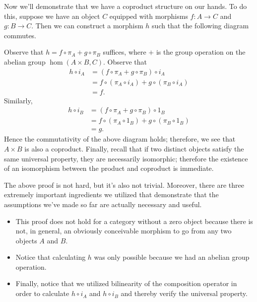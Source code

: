 \begin{prf}
\begin{center}
        \end{center} 
        Now we'll demonstrate that we have a coproduct structure on our hands. 
        To do this, suppose we have an object $C$ equipped with morphisms 
        $f: A \to C$ and $g: B \to C$. Then we can construct a morphism $h$ such that the following 
        diagram commutes. 
        \begin{center}
        \end{center}
        Observe that $h = f\circ \pi_A + g \circ \pi_B$ suffices, where 
        $+$ is the group operation on the abelian group $\hom(A \times B, C)$.
        Observe that 
        \begin{align*}
            h \circ i_A &= (f\circ \pi_A + g \circ \pi_B) \circ i_A\\
            &= f \circ (\pi_A \circ i_A) + g \circ (\pi_B \circ i_A)\\
            &= f.
        \end{align*}
        Similarly, 
        \begin{align*}
            h \circ i_B &= (f\circ \pi_A + g \circ \pi_B) \circ 1_B\\
            &= f \circ (\pi_A \circ 1_B) + g \circ (\pi_B \circ 1_B)\\
            &= g.
        \end{align*}
        Hence the commutativity of the above diagram holds; therefore, we see 
        that $A \times B$ is also a coproduct. Finally, recall that if two 
        distinct objects satisfy the same universal property, they are necessarily isomorphic; 
        therefore the existence of an isomorphism between the product and coproduct is immediate. 
\end{prf}
\textcolor{NavyBlue}{The above proof is not hard, but it's also not trivial. 
Moreover, there are three extremely important ingredients we utilized that demonstrate that 
the assumptions we've made so far are actually necessary and useful.}
\begin{itemize}
    \item This proof does not hold for a category without a zero object because 
    there is not, in general, an obviously conceivable morphism to go from any two objects 
    $A$ and $B$. 
    \item Notice that calculating $h$ was only possible because we had an abelian 
    group operation. 
    \item  Finally, notice that we utilized bilinearity of the composition operator in order to 
    calculate $h \circ i_A$ and $h \circ i_B$ and thereby verify the universal property.
\end{itemize}

